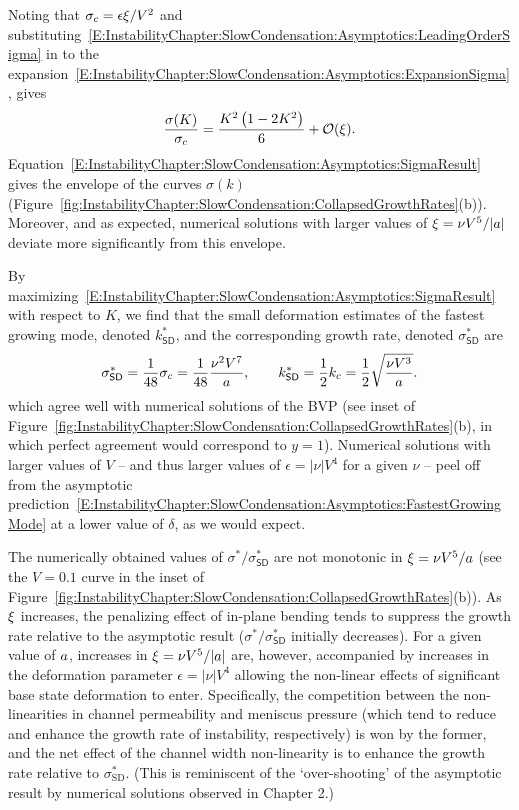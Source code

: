 Noting that $\sigma_c = \epsilon\xi/V^2$ and substituting~\eqref{E:InstabilityChapter:SlowCondensation:Asymptotics:LeadingOrderSigma} in to the expansion~\eqref{E:InstabilityChapter:SlowCondensation:Asymptotics:ExpansionSigma}, gives
\begin{equation}\label{E:InstabilityChapter:SlowCondensation:Asymptotics:SigmaResult}
\frac{\sigma(K)}{\sigma_c} =  \frac{K^2\left(1-2K^2 \right)}{6}  + \mathcal{O}(\xi).
\end{equation}
Equation~\eqref{E:InstabilityChapter:SlowCondensation:Asymptotics:SigmaResult} gives the envelope of the curves $\sigma(k)$ (Figure~\ref{fig:InstabilityChapter:SlowCondensation:CollapsedGrowthRates}(b)). Moreover, and as expected, numerical solutions with larger values of $\xi = \nu V^5 /|a|$ deviate more significantly from this envelope.

By maximizing~\eqref{E:InstabilityChapter:SlowCondensation:Asymptotics:SigmaResult} with respect to $K$, we find that the small deformation estimates of the fastest growing mode, denoted $k^*_{\textsf{SD}}$, and the corresponding growth rate, denoted $\sigma^*_{\textsf{SD}}$ are
\begin{equation}\label{E:InstabilityChapter:SlowCondensation:Asymptotics:FastestGrowingMode}
\sigma^*_{\textsf{SD}}= \frac{1}{48}\sigma_c = \frac{1}{48}\frac{\nu^2 V^7}{a}, \qquad k^*_{\textsf{SD}}= \frac{1}{2}k_c = \frac{1}{2}\sqrt{\frac{\nu V^3}{a}}.
\end{equation}
which agree well with numerical solutions of the BVP (see inset of Figure~\ref{fig:InstabilityChapter:SlowCondensation:CollapsedGrowthRates}(b), in which perfect agreement would correspond to $y = 1$). Numerical solutions with larger values of $V$ -- and thus larger values of $\epsilon = |\nu| V^4$ for a given $\nu$ -- peel off from the asymptotic prediction~\eqref{E:InstabilityChapter:SlowCondensation:Asymptotics:FastestGrowingMode} at a lower value of $\delta$, as we would expect.

The numerically obtained values of $\sigma^*/\sigma^*_{\textsf{SD}}$ are not monotonic in $\xi = \nu V^5/a$ (see the $V = 0.1$ curve in the inset of Figure~\ref{fig:InstabilityChapter:SlowCondensation:CollapsedGrowthRates}(b)). As $\xi$ increases, the penalizing effect of in-plane bending tends to suppress the growth rate relative to the asymptotic result ($\sigma^*/\sigma^*_{\textsf{SD}}$ initially decreases). For a given value of $a$, increases in $\xi = \nu V^5/|a|$ are, however, accompanied by increases in the deformation parameter $\epsilon = |\nu| V^4$ allowing the non-linear effects of significant base state deformation to enter. Specifically, the competition between the non-linearities in channel permeability and meniscus pressure (which tend to reduce and enhance the growth rate of instability, respectively) is won by the former, and the net effect of the channel width non-linearity is to enhance the growth rate relative to $\sigma^*_{\text{SD}}$. (This is reminiscent of the `over-shooting' of the asymptotic result by numerical solutions observed in Chapter 2.)

